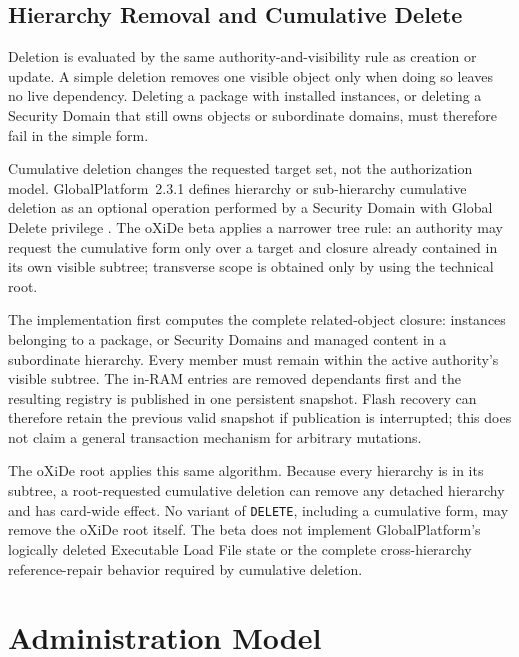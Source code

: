 \subsection{Hierarchy Removal and Cumulative Delete}

Deletion is evaluated by the same authority-and-visibility rule as creation or
update. A simple deletion removes one visible object only when doing so leaves
no live dependency. Deleting a package with installed instances, or deleting a
Security Domain that still owns objects or subordinate domains, must therefore
fail in the simple form.

Cumulative deletion changes the requested target set, not the authorization
model. GlobalPlatform~2.3.1 defines hierarchy or sub-hierarchy cumulative
deletion as an optional operation performed by a Security Domain with Global
Delete privilege . The oXiDe beta applies a
narrower tree rule: an authority may request the cumulative form only over a
target and closure already contained in its own visible subtree; transverse
scope is obtained only by using the technical root.

The implementation first computes the complete related-object closure:
instances belonging to a package, or Security Domains and managed content in a
subordinate hierarchy. Every member must remain within the active authority's
visible subtree. The in-RAM entries are removed dependants first and the
resulting registry is published in one persistent snapshot. Flash recovery can
therefore retain the previous valid snapshot if publication is interrupted;
this does not claim a general transaction mechanism for arbitrary mutations.

The oXiDe root applies this same algorithm. Because every hierarchy is in its
subtree, a root-requested cumulative deletion can remove any detached
hierarchy and has card-wide effect. No variant of \texttt{DELETE}, including a
cumulative form, may remove the oXiDe root itself. The beta does not implement
GlobalPlatform's logically deleted Executable Load File state or the complete
cross-hierarchy reference-repair behavior required by cumulative deletion.

\section{Administration Model}
\label{sec:gp-administration-model}


